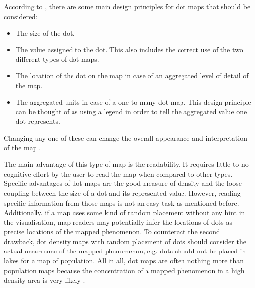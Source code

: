 According to \citeauthor{Tyner2010}, there are some main design principles for dot maps that should be considered:
\begin{itemize}
\item The size of the dot.
\item The value assigned to the dot. This also includes the correct use of the two different types of dot maps.
\item The location of the dot on the map in case of an aggregated level of detail of the map.
\item The aggregated units in case of a one-to-many dot map. This design principle can be thought of as using a legend in order to tell the aggregated value one dot represents.
\end{itemize}
Changing any one of these can change the overall appearance and interpretation of the map .

The main advantage of this type of map is the readability. It requires little to no cognitive effort by the user to read the map when compared to other types. Specific advantages of dot maps are the good measure of density and the loose coupling between the size of a dot and its represented value.
However, reading specific information from those maps is not an easy task as mentioned before. Additionally, if a map uses some kind of random placement without any hint in the visualisation, map readers may potentially infer the locations of dots as precise locations of the mapped phenomenon. To counteract the second drawback, dot density maps with random placement of dots should consider the actual occurrence of the mapped phenomenon, e.g. dots should not be placed in lakes for a map of population.
All in all, dot maps are often nothing more than population maps because the concentration of a mapped phenomenon in a high density area is very likely .